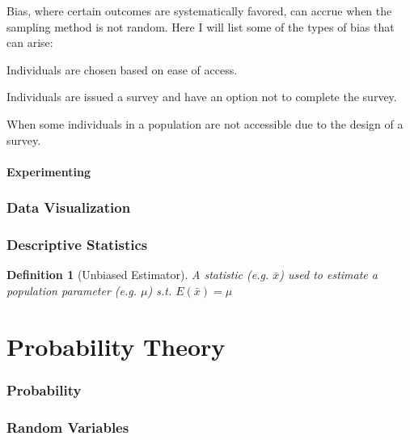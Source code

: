 \documentclass{article}
\newtheorem{mydef}{Definition}
\newcommand{\xbar}{\bar x}
\begin{document}
\noindent Bias, where certain outcomes are systematically favored, can accrue when the sampling method is not random.  Here I will list some of the types of bias that can arise:

\begin{description}[style=nextline]
\item [Convenience Bias] Individuals are chosen based on ease of access.

\item [Response Bias] Individuals are issued a survey and have an option not to complete the survey.

\item [Undercoverage Bias] When some individuals in a population are not accessible due to the design of a survey.

    
\end{description}

\noindent 
\begin{description}[style=nextline]
\item [] 

\end{description}


\subsection{Experimenting}


\section{Data Visualization}
\section{Descriptive Statistics}

\begin{mydef}[Unbiased Estimator]
A statistic (e.g. $\xbar$) used to estimate a population parameter (e.g. $\mu$) s.t. $E(\xbar) = \mu$ 
\end{mydef}

\newpage
\part{Probability Theory}
\section{Probability}
\section{Random Variables}
\end{document}
